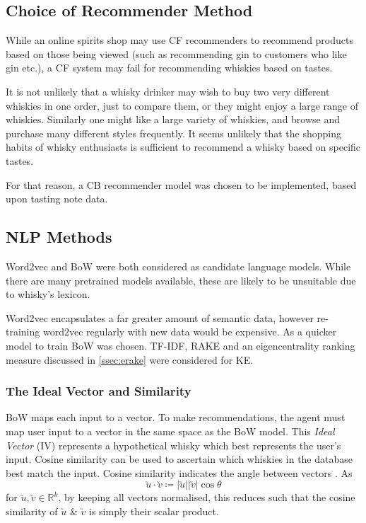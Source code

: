 \subsection{Choice of Recommender Method}
While an online spirits shop may use CF recommenders to recommend products based on those being viewed
(such as recommending gin to customers who like gin etc.), a CF system may fail for
recommending whiskies based on tastes.

It is not unlikely that a whisky drinker may wish to buy two very different whiskies in one order, just 
to compare them, or they might enjoy a large range of whiskies. Similarly one might like a large
variety of whiskies, and browse and purchase many different styles frequently. 
It seems unlikely that the shopping habits of whisky enthusiasts is sufficient to recommend a whisky
based on specific tastes.

For that reason, a CB recommender model was chosen to be implemented, based upon tasting note data.

\subsection{NLP Methods}\label{whiskylang}
Word2vec and BoW were both considered as candidate language models. While there are
many pretrained models available, these are likely to be unsuitable due to whisky's lexicon.

Word2vec encapsulates a far greater amount of semantic data, however re-training
word2vec regularly with new data would be expensive. As a quicker model to train
BoW was chosen.  TF-IDF, RAKE and an eigencentrality ranking measure discussed in 
\autoref{ssec:erake} were considered for KE.

\subsubsection{The Ideal Vector and Similarity}\label{sssec:cossim}
BoW maps each input to a vector. To make recommendations, the agent must
map user input to a vector in the same space as the BoW model. This
\emph{Ideal Vector} (IV) represents a hypothetical whisky which best represents 
the user's input. Cosine similarity can be used to ascertain which whiskies in 
the database best match the input.  Cosine similarity indicates the angle between
vectors \cite{Melville2010}. As  
\begin{equation}
    \utilde{u} \cdot \utilde{v} \coloneqq \vert \utilde{u} \vert \vert \utilde{v} \vert \cos{\theta}
\end{equation}
for $\utilde{u}, \utilde{v}\in \mathbb{R} ^{k}$, by keeping all vectors normalised, this reduces such
that the cosine similarity of $\utilde{u}$ \& $\utilde{v}$ is simply their scalar product.

